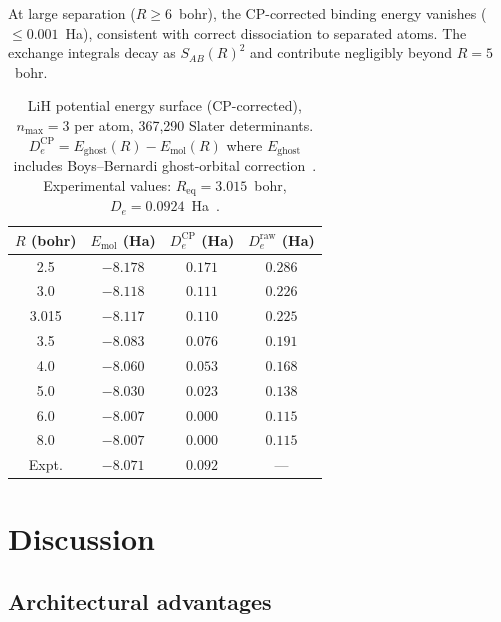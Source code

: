 \documentclass[aps,pra,twocolumn,superscriptaddress,longbibliography,floatfix]{revtex4-2}
\begin{document}
At large separation ($R \geq 6$~bohr), the CP-corrected binding energy
vanishes ($\leq 0.001$~Ha), consistent with correct dissociation to
separated atoms. The exchange integrals decay as $S_{AB}(R)^2$ and
contribute negligibly beyond $R = 5$~bohr.

\begin{table}[h]
\caption{\label{tab:lih}%
LiH potential energy surface (CP-corrected), $n_{\max}=3$ per atom,
367{,}290 Slater determinants.
$D_e^{\text{CP}} = E_{\text{ghost}}(R) - E_{\text{mol}}(R)$
where $E_{\text{ghost}}$ includes Boys--Bernardi ghost-orbital
correction~\cite{Boys1970}.
Experimental values: $R_{\text{eq}} = 3.015$~bohr,
$D_e = 0.0924$~Ha~\cite{Huber1979}.}
\begin{ruledtabular}
\begin{tabular}{cccc}
$R$ (bohr) & $E_{\text{mol}}$ (Ha)
           & $D_e^{\text{CP}}$ (Ha)
           & $D_e^{\text{raw}}$ (Ha) \\
\hline
2.5   & $-8.178$ & $0.171$ & $0.286$ \\
3.0   & $-8.118$ & $0.111$ & $0.226$ \\
3.015 & $-8.117$ & $0.110$ & $0.225$ \\
3.5   & $-8.083$ & $0.076$ & $0.191$ \\
4.0   & $-8.060$ & $0.053$ & $0.168$ \\
5.0   & $-8.030$ & $0.023$ & $0.138$ \\
6.0   & $-8.007$ & $0.000$ & $0.115$ \\
8.0   & $-8.007$ & $0.000$ & $0.115$ \\
\hline
Expt. & $-8.071$ & $0.092$ & --- \\
\end{tabular}
\end{ruledtabular}
\end{table}

\section{Discussion}
\label{sec:discussion}

\subsection{Architectural advantages}
\label{sec:advantages}
\end{document}
